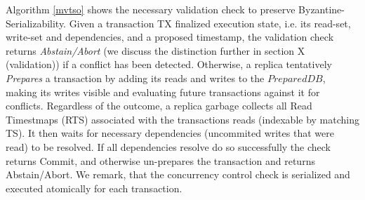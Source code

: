 Algorithm \ref{mvtso} shows the necessary validation check to preserve Byzantine-Serializability. 
Given a transaction TX finalized execution state, i.e. its read-set, write-set and dependencies, and a proposed timestamp, the validation check returns \textit{Abstain/Abort} (we discuss the distinction further in section X (validation)) if a conflict has been detected. Otherwise, a replica tentatively \textit{Prepares} a transaction by adding its reads and writes to the $PreparedDB$, making its writes visible and evaluating future transactions against it for conflicts. Regardless of the outcome, a replica garbage collects all Read Timestmaps (RTS) associated with the transactions reads (indexable by matching TS).
It then waits for necessary dependencies (uncommited writes that were read) to be resolved.  
If all dependencies resolve do so successfully the check returns Commit, and otherwise un-prepares the transaction and returns Abstain/Abort. We remark, that the concurrency control check is serialized and executed atomically for each transaction.


 





